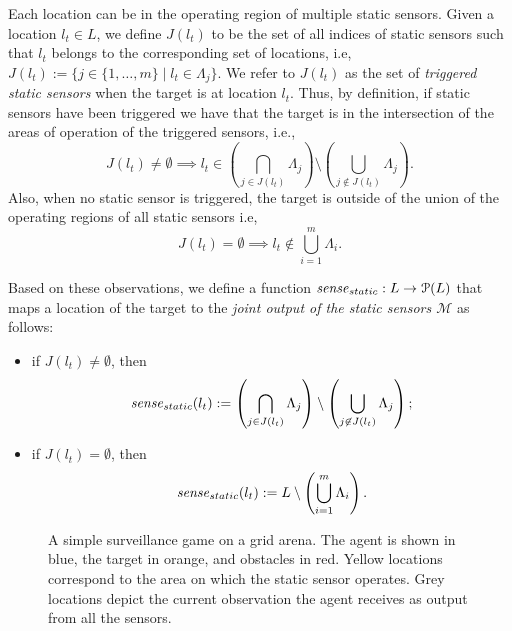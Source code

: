 Each location can be in the operating region of multiple static sensors. Given a location $l_t \in L$, we define $J(l_t)$ to be the set of all indices of static sensors such that $l_t$ belongs to the corresponding set of locations, i.e, 
$J(l_t) := \{j \in \{1,\ldots,m\}\mid l_t\in \Lambda_j\}.$
We refer to $J(l_t)$ as the set of \emph{triggered static sensors}  when the target is at location $l_t$. 
Thus, by definition, if static sensors have been triggered we have that the target is in the intersection of the areas of operation of the triggered sensors, i.e., $$ J(l_t) \neq \emptyset \implies l_t \in \left(\bigcap_{j\in J(l_t)}\Lambda_j\right) \setminus \left(\bigcup_{j\not\in J(l_t)}\Lambda_j\right).$$ Also, when no static sensor is triggered, the target is outside of the union of the operating regions of all static sensors i.e, $$J(l_t) = \emptyset \implies l_t \notin \bigcup_{i=1}^m \Lambda_i.$$

Based on these observations, we define a function $\mathit{sense}_{static}: L \to \mathcal{P}(L)$ that maps a location of the target to the \emph{joint output of the static sensors $\mathcal M$} as follows:
\begin{itemize}
    \item if $J(l_t) \neq \emptyset$, then 
\[\mathit{sense}_{static}(l_t) := \left(\bigcap_{j\in J(l_t)}\Lambda_j\right) \setminus \left(\bigcup_{j\not\in J(l_t)}\Lambda_j\right);\]
    
    \item if $J(l_t) = \emptyset$, then
\[\mathit{sense}_{static}(l_t) := L \setminus \left(\bigcup_{i=1}^m \Lambda_i\right).\]
\end{itemize}


\begin{figure}
\centering
{} \hspace{0.45 in}
\hfill
\caption[A surveillance game example with static sensors.]{A simple surveillance game on a grid arena. The agent is shown in blue, the target in orange, and obstacles in red. Yellow locations correspond to the area on which the static sensor operates. Grey locations depict the current observation the agent receives as output from all the sensors.}
\label{fig:simple-sensing-static-sensors}
\end{figure}

